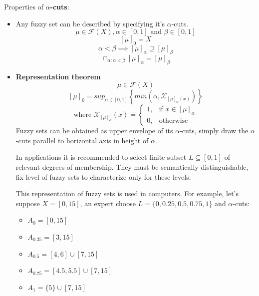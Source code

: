 \documentclass{article}
\begin{document}
Properties of \textbf{$\alpha$-cuts}:
\begin{itemize}
    \item Any fuzzy set can be described by specifying it's $\alpha$-cuts.
          $$\mu\in\mathcal{F}(X), \alpha\in[0,1] \text{ and }\beta\in[0,1]$$
          $$[\mu]_0=X$$
          $$\alpha < \beta\implies [\mu]_\alpha \supseteq[\mu]_\beta$$
          $$\cap_{\alpha:\alpha < \beta} [\mu]_\alpha = [\mu]_\beta$$
    \item \textbf{Representation theorem}
          $$\mu\in\mathcal{F}(X)$$
          $$[\mu]_0=sup_{\alpha\in[0,1]} \left\{ min\left(\alpha,\mathcal{X}_{[\mu]_\alpha (x)}\right)\right\}$$
          \[
              \text{where } \mathcal{X}_{[\mu]_\alpha}(x)=
              \begin{cases}
                  1, & \text{if }x\in [\mu]_\alpha \\
                  0, & \text{otherwise}
              \end{cases}
          \]
          Fuzzy sets can be obtained as upper envelope of its $\alpha$-cuts, simply draw the
          $\alpha$-cuts parallel to horizontal axis in height of $\alpha$.

          In applications it is recommended to select finite subset $L\subseteq [0,1]$ of relevant degrees of
          membership. They must be semantically distinguishable, fix level of fuzzy sets to characterize only
          for these levels.

          This representation of fuzzy sets is used in computers. For example, let's suppose $X=[0,15]$,
          an expert choose $L=\{0,0.25,0.5,0.75,1\}$ and  $\alpha$-cuts:
          \begin{itemize}
              \item $A_0 =[0,15]$
              \item $A_{0.25} =[3,15]$
              \item $A_{0.5} =[4,6]\cup [7,15]$
              \item $A_{0.75} =[4.5,5.5]\cup [7,15]$
              \item $A_1 =\{5\}\cup [7,15]$
          \end{itemize}
\end{itemize}
\end{document}
